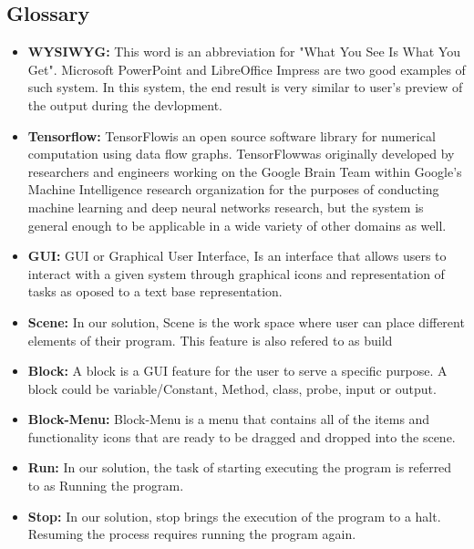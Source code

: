 \documentclass[journal,10pt,onecolumn,compsoc]{IEEEtran} \usepackage[margin=1.0in]{geometry} \usepackage{pdfpages} \usepackage{graphicx}
\begin{document}
\subsection{Glossary}
\begin{itemize}
	\item \textbf{WYSIWYG:}
		This word is an abbreviation for "What You See Is What You Get".
		Microsoft PowerPoint and LibreOffice Impress are two good examples of such system. 
		In this system, the end result is very similar to user's preview of the output during the devlopment.\\
	\item \textbf{Tensorflow\texttrademark:}
		TensorFlow\texttrademark is an open source software library for numerical computation using data flow graphs.
		TensorFlow\texttrademark was originally developed by researchers and engineers working on the Google Brain Team within
		Google's Machine Intelligence research organization for the purposes of conducting machine learning and 
		deep neural networks research, but the system is general enough to be applicable in a wide variety of other domains as well.\\
	\item \textbf{GUI:}
		GUI or Graphical User Interface, Is an interface that allows users to interact with a given system through graphical icons and representation of tasks as oposed to a text base representation.\\
	\item \textbf{Scene:}
		In our solution, Scene is the work space where user can place different elements of their program.
		This feature is also refered to as build\\
	\item \textbf{Block:}
		A block is a GUI feature for the user to serve a specific purpose. A block could be variable/Constant, Method, class, probe, input or output.\\
	\item \textbf{Block-Menu:}
		Block-Menu is a menu that contains all of the items and functionality icons that are ready to be dragged and dropped into the scene.\\
	\item \textbf{Run:}
		In our solution, the task of starting executing the program is referred to as Running the program.\\
	\item \textbf{Stop:}
		In our solution, stop brings the execution of the program to a halt. Resuming the process requires running the program again.

\end{itemize}
\end{document}
